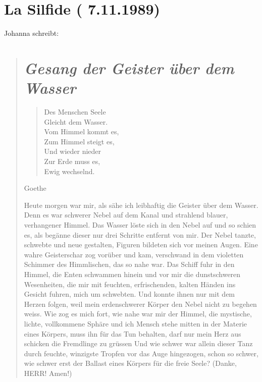 \documentclass[10pt,titlepage,a5paper]{book}
\newenvironment{tg}{\begin{quote}\em}{\end{quote}}
\newenvironment{dichter}{\begin{flushright}}{\end{flushright}}
\begin{document}
\section*{La Silfide ( 7.11.1989)}


 
Johanna schreibt:

\begin{tg}




\section*{\em Gesang der Geister über dem Wasser}


\begin{verse}
Des Menschen Seele\\
Gleicht dem Wasser.\\
Vom Himmel kommt es,\\
Zum Himmel steigt es,\\
Und wieder nieder\\
Zur Erde muss es,\\
Ewig wechselnd.
\end{verse}
\begin{dichter} Goethe \end{dichter}


Heute morgen war mir, als sähe ich leibhaftig die Geister über dem Wasser.
Denn es war schwerer Nebel auf dem Kanal und strahlend blauer, verhangener Himmel. Das Wasser löste sich in den Nebel auf und so schien es, als begänne dieser nur drei Schritte entfernt von mir. Der Nebel tanzte, schwebte und neue gestalten, Figuren bildeten sich vor meinen Augen. Eine wahre Geisterschar zog vorüber und kam, verschwand in dem violetten Schimmer des Himmlischen, das so nahe war. Das Schiff fuhr in den Himmel, die Enten schwammen hinein und vor mir die dunstschweren Wesenheiten, die mir mit feuchten, erfrischenden, kalten Händen ins Gesicht fuhren, mich um schwebten. Und konnte ihnen nur mit dem Herzen folgen, weil mein erdenschwerer Körper den Nebel nicht zu  begehen weiss. Wie zog es mich fort, wie nahe war mir der Himmel, die mystische, lichte, vollkommene Sphäre und ich Mensch stehe mitten in der Materie eines Körpers, muss ihn für das Tun behalten, darf nur mein Herz aus schicken die Fremdlinge zu grüssen Und wie schwer war allein dieser Tanz durch feuchte, winzigste Tropfen vor das Auge hingezogen, schon so schwer, wie schwer erst der Ballast eines Körpers für die freie Seele? (Danke, HERR! Amen!)


\end{tg}
\end{document}
